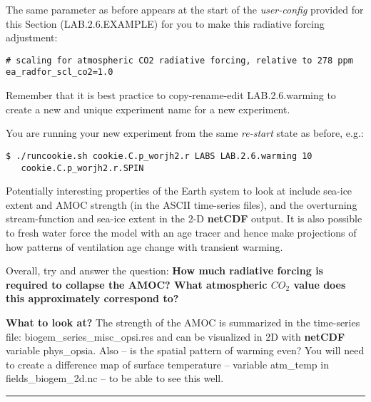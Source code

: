 The same parameter as before appears at the start of the \textit{user-config} provided for this Section (\textsf{\footnotesize LAB.2.6.EXAMPLE}) for you to make this radiative forcing adjustment:

\vspace{-2mm}\small\begin{verbatim}
# scaling for atmospheric CO2 radiative forcing, relative to 278 ppm
ea_radfor_scl_co2=1.0
\end{verbatim}\normalsize\vspace{-2mm}

Remember that it is best practice to copy-rename-edit \textsf{\footnotesize LAB.2.6.warming} to create a new and unique experiment name for a new experiment.

\vspace{1mm}
You are running your new experiment from the same \textit{re-start} state as before, e.g.:

\vspace{-2mm}\small\begin{verbatim}
$ ./runcookie.sh cookie.C.p_worjh2.r LABS LAB.2.6.warming 10 
   cookie.C.p_worjh2.r.SPIN
\end{verbatim}\normalsize\vspace{-2mm}

Potentially interesting properties of the Earth system to look at include sea-ice extent and AMOC strength (in the ASCII time-series files), and the overturning stream-function and sea-ice extent in the 2-D \textbf{netCDF} output. It is also possible to fresh water force the model with an age tracer and hence make projections of how patterns of ventilation age change with transient warming.

\vspace{1mm}
Overall, try and answer the question: \textbf{How much radiative forcing is required to collapse the AMOC? What atmospheric \(CO_{2}\) value does this approximately correspond to?} 

\noindent \textbf{What to look at?} The strength of the AMOC is summarized in the time-series file: \textsf{\footnotesize biogem\_series\_misc\_opsi.res} and can be visualized in 2D with \textbf{netCDF} variable \textsf{\footnotesize phys\_opsia}.
Also -- is the spatial pattern of warming even? You will need to create a difference map of surface temperature -- variable \textsf{\footnotesize atm\_temp} in \textsf{\footnotesize fields\_biogem\_2d.nc} -- to be able to see this well.

\vspace{1mm}\noindent\rule{4cm}{0.5pt}\vspace{2mm}

